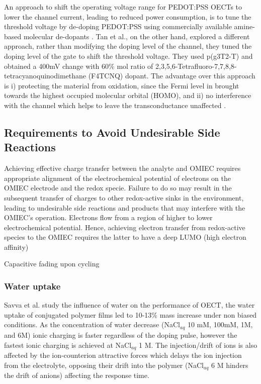 An approach to shift the operating voltage range for PEDOT:PSS OECTs to lower the channel current, leading to reduced power consumption, is to tune the threshold voltage by de-doping PEDOT:PSS using commercially available amine-based molecular de-dopants \cite{keeneEnhancementModePEDOTPSS2020}. Tan et al., on the other hand, explored a different approach, rather than modifying the doping level of the channel, they tuned the doping level of the gate to shift the threshold voltage. They used p(g3T2-T) and obtained a 400mV change with 60\% mol ratio of 2,3,5,6-Tetrafluoro-7,7,8,8-tetracyanoquinodimethane (F4TCNQ) dopant. The advantage over this approach is i) protecting the material from oxidation, since the Fermi level in brought towards the highest occupied molecular orbital (HOMO), and ii) no interference with the channel which helps to leave the transconductance unaffected \cite{tanTuningOrganicElectrochemical2022}.


{\subsection{Requirements to Avoid Undesirable Side Reactions}}
\label{subsec:req}

Achieving effective charge transfer between the analyte and OMIEC requires appropriate alignment of the electrochemical potential of electrons on the OMIEC electrode and the redox specie. Failure to do so may result in the subsequent transfer of charges to other redox-active sinks in the environment, leading to undesirable side reactions and products that may interfere with the OMIEC’s operation. Electrons flow from a region of higher to lower electrochemical potential. Hence, achieving electron transfer from redox-active species to the OMIEC requires the latter to have a deep LUMO (high electron affinity) \cite{tanMixedIonicElectronic2022} %

Capacitive fading upon cycling

\subsubsection{Water uptake}

Savva et al. study the influence of water on the performance of OECT, the water uptake of conjugated polymer films led to 10-13\% mass increase under non biased conditions. As the concentration of water decrease (NaCl$_{aq}$ 10 mM, 100mM, 1M, and 6M) ionic charging is faster regardless of the doping pulse, however the fastest ionic charging is achieved at NaCl$_{aq}$ 1 M. The injection/drift of ions is also affected by the ion-counterion attractive forces which delays the ion injection from the electrolyte, opposing their drift into the polymer (NaCl$_{aq}$ 6 M hinders the drift of anions) affecting the response time. \cite{savvaInfluenceWaterPerformance2019}

